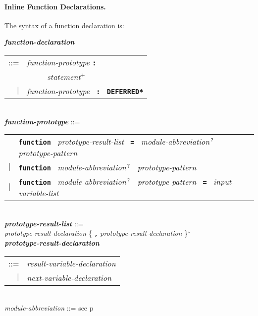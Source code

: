 \documentclass[12pt]{article}
\newcommand{\subsubsubsection}[1]{\paragraph[#1]{#1.}}
\newcommand{\TT}[1]{{\tt \bfseries #1}}
\newcommand{\STAR}{{\Large $^\star$}}
\newcommand{\PLUS}[1][]{{$^{+#1}$}}
\newcommand{\QMARK}{{$^{\,\mbox{\footnotesize ?}}$}}
\newcommand{\ttkey}[1]{{\tt \bfseries #1}}
\newcommand{\emkey}[1]{{\em \bfseries #1}}
\newcommand{\pagref}[1]{p\pageref{#1}}
\newenvironment{indpar}[1][0.3in]%
	{\begin{list}{}%
		     {\setlength{\itemsep}{0in}%
		      \setlength{\topsep}{0in}%
		      \setlength{\parsep}{1ex}%
		      \setlength{\labelwidth}{#1}%
		      \setlength{\leftmargin}{#1}%
		      \addtolength{\leftmargin}{\labelsep}}%
	 \item}%
	{\end{list}}
\begin{document}
\subsubsubsection{Inline Function Declarations}
\label{INLINE-FUNCTION-DECLARATIONS}

The syntax of a function declaration is:

\begin{indpar}[0.1in]
\emkey{function-declaration}\label{FUNCTION-DECLARATION}
    \begin{tabular}[t]{rl}
    ::= &  {\em function-prototype} \TT{:} \\
	& \TT{~~~~~}{\em statement}\PLUS{} \\
    $|$ &  {\em function-prototype}~ \TT{:}~ \ttkey{*DEFERRED*} \\
    \end{tabular}
\\[2ex]
\emkey{function-prototype}\label{FUNCTION-PROTOTYPE} ::= \\
\hspace*{0.25in}
    \begin{tabular}[t]{@{}rl}
        & \ttkey{function}~
          {\em prototype-result-list}~ \TT{=}~
          {\em module-abbreviation}\QMARK{}~
	                {\em prototype-pattern} \\
    $|$ & \ttkey{function}~ {\em module-abbreviation}\QMARK{}~
                           {\em prototype-pattern} \\
    $|$ & \ttkey{function}~ {\em module-abbreviation}\QMARK{}~
                           {\em prototype-pattern}~ \TT{=}~
                           {\em input-variable-list} \\
    \end{tabular}
\\[0.5ex]
\emkey{prototype-result-list}\label{PROTOTYPE-RESULT-LIST} ::= \\
\hspace*{0.5in}
    {\em prototype-result-declaration}
    \{ \TT{,} {\em prototype-result-declaration} \}\STAR{}
\\[0.5ex]
\emkey{prototype-result-declaration}\label{PROTOTYPE-RESULT-DECLARATION} \\
\hspace*{0.5in}\begin{tabular}[t]{rl}
    ::= & {\em result-variable-declaration} \\
    $|$ & {\em next-variable-declaration} \\
    \end{tabular}
\\[0.5ex]
{\em module-abbreviation} ::= see \pagref{MODULE-ABBREVIATION}
\\[0.5ex]

\end{indpar}
\end{document}
